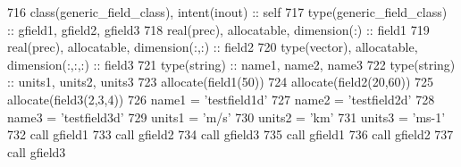 \begin{DoxyCode}
716     \textcolor{keywordtype}{class}(generic\_field\_class), \textcolor{keywordtype}{intent(inout)} :: self
717     \textcolor{keywordtype}{type}(generic\_field\_class) :: gfield1, gfield2, gfield3
718     \textcolor{keywordtype}{real(prec)}, \textcolor{keywordtype}{allocatable}, \textcolor{keywordtype}{dimension(:)} :: field1
719     \textcolor{keywordtype}{real(prec)}, \textcolor{keywordtype}{allocatable}, \textcolor{keywordtype}{dimension(:,:)} :: field2
720     \textcolor{keywordtype}{type}(vector), \textcolor{keywordtype}{allocatable}, \textcolor{keywordtype}{dimension(:,:,:)} :: field3
721     \textcolor{keywordtype}{type}(string) :: name1, name2, name3
722     \textcolor{keywordtype}{type}(string) :: units1, units2, units3
723     \textcolor{keyword}{allocate}(field1(50))
724     \textcolor{keyword}{allocate}(field2(20,60))
725     \textcolor{keyword}{allocate}(field3(2,3,4))
726     name1 = \textcolor{stringliteral}{'testfield1d'}
727     name2 = \textcolor{stringliteral}{'testfield2d'}
728     name3 = \textcolor{stringliteral}{'testfield3d'}
729     units1 = \textcolor{stringliteral}{'m/s'}
730     units2 = \textcolor{stringliteral}{'km'}
731     units3 = \textcolor{stringliteral}{'ms-1'}
732     \textcolor{keyword}{call }gfield1%
733     \textcolor{keyword}{call }gfield2%
734     \textcolor{keyword}{call }gfield3%
735     \textcolor{keyword}{call }gfield1%
736     \textcolor{keyword}{call }gfield2%
737     \textcolor{keyword}{call }gfield3%
\end{DoxyCode}
